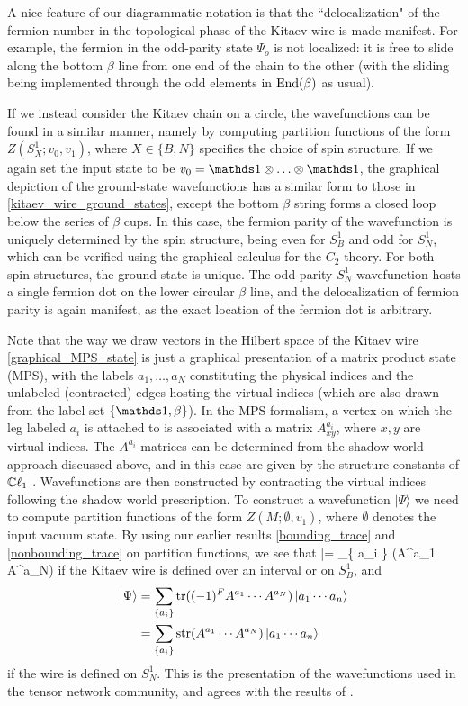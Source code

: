 A nice feature of our diagrammatic notation is that the ``delocalization" of the fermion number in the topological phase of the 
Kitaev wire is made manifest.
For example, the fermion in the odd-parity state $\Psi_o$ is not localized: it is free to slide along the bottom $\beta$ line
from one end of the chain to the other (with the sliding being implemented through the odd elements in $\text{End}(\beta)$
as usual).

If we instead consider the Kitaev chain on a circle, the wavefunctions can be found in a similar manner, 
namely by computing partition functions of the form $Z(S^1_X;v_0,v_1)$, where $X\in\{B,N\}$
specifies the choice of spin structure. 
If we again set the input state to be $v_0=\unit\tp\dots\tp\unit$, the graphical depiction of the 
ground-state wavefunctions 
has a similar form to those in \eqref{kitaev_wire_ground_states}, except the bottom $\beta$ string 
forms a closed loop below the series of $\beta$ cups. 
In this case, the fermion parity of the wavefunction is uniquely determined by the spin structure, being 
even for $S^1_B$ and odd for $S^1_N$, which can be verified using the graphical calculus for the 
$C_2$ theory. For both spin structures, the ground state is unique. 
The odd-parity $S^1_N$ wavefunction hosts a single fermion dot on the lower circular $\beta$ line, 
and the delocalization of fermion parity is again manifest, as the exact location of the fermion dot 
is arbitrary. 

Note that the way we draw vectors in the Hilbert space of the Kitaev wire \eqref{graphical_MPS_state}
is just a graphical presentation of a matrix product state (MPS), with the labels
$a_1,\dots,a_N$ constituting the physical indices and the unlabeled (contracted) edges hosting the virtual 
indices (which are also drawn from the label set $\{\unit, \beta\}$). 
In the MPS formalism, a vertex on which the leg labeled $a_i$ is attached 
to is associated with a matrix $A^{a_i}_{xy}$, where $x,y$ are virtual indices. 
The $A^{a_i}$ matrices can be determined from the shadow world approach 
discussed above, and in this case are given by the structure constants of $\mathbb{C}\ell_1$ \cite{turzillo2016}. 
Wavefunctions are then constructed by contracting the virtual indices following the 
shadow world prescription. To construct a wavefunction $|\Psi\rangle$ we need to compute 
partition functions of the form $Z(M;\emptyset,v_1)$, where $\emptyset$ denotes 
the input vacuum state. 
By using our earlier results \eqref{bounding_trace} and \eqref{nonbounding_trace} on 
partition functions, we see that 
\be |\Psi\rangle = \sum_{\{ a_i \} }\tr(A^{a_1} \cdots A^{a_N})  \ee
if the Kitaev wire is defined over an interval or on $S^1_B$, and 
\begin{align}
 |\Psi\rangle & = \sum_{\{ a_i \} }\text{tr}((-1)^FA^{a_1} \cdots A^{a_N}) \left|a_1 \cdots a_n\right\rangle \\ 
 & =\sum_{\{ a_i \} }\text{str}(A^{a_1} \cdots A^{a_N}) \left|a_1 \cdots a_n\right\rangle 
 \end{align}
if the wire is defined on $S^1_N$. 
This is the presentation of the wavefunctions used in the tensor network community, 
and agrees with the results of \cite{turzillo2016,bultinck2017b}. 

